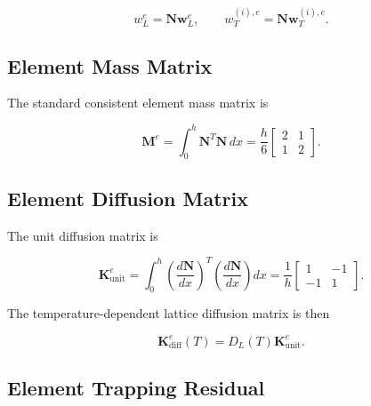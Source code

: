 \documentclass[a4paper,12pt,oneside]{report}
\begin{document}
\begin{equation}
w_L^e=\mathbf{N}\mathbf{w}_L^e,
\qquad
w_T^{(i),e}
=
\mathbf{N}\mathbf{w}_T^{(i),e}.
\end{equation}

\subsection{Element Mass Matrix}

The standard consistent element mass matrix is

\begin{equation}
\mathbf{M}^e
=
\int_0^h
\mathbf{N}^{T}\mathbf{N}\,dx
=
\frac{h}{6}
\begin{bmatrix}
2 & 1\\
1 & 2
\end{bmatrix}.
\label{eq:ch3_mass}
\end{equation}

\subsection{Element Diffusion Matrix}

The unit diffusion matrix is

\begin{equation}
\mathbf{K}_{\mathrm{unit}}^e
=
\int_0^h
\left(
\frac{d\mathbf{N}}{dx}
\right)^T
\left(
\frac{d\mathbf{N}}{dx}
\right)dx
=
\frac{1}{h}
\begin{bmatrix}
1 & -1\\
-1 & 1
\end{bmatrix}.
\label{eq:ch3_kunit}
\end{equation}

The temperature-dependent lattice diffusion matrix is then

\begin{equation}
\mathbf{K}_{\mathrm{diff}}^e(T)
=
D_L(T)
\mathbf{K}_{\mathrm{unit}}^e.
\label{eq:ch3_kdiff}
\end{equation}

\subsection{Element Trapping Residual}
\end{document}
